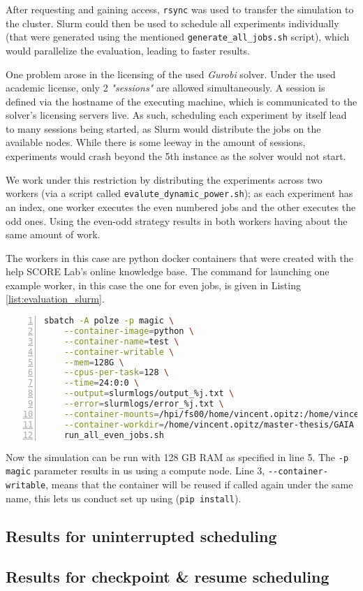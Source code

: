 After requesting and gaining access, \verb|rsync| was used to transfer the simulation to the cluster. 
Slurm could then be used to schedule all experiments individually (that were generated using the mentioned \verb|generate_all_jobs.sh| script), which would parallelize the evaluation, leading to faster results.

One problem arose in the licensing of the used \emph{Gurobi} solver. 
Under the used academic license, only 2 \emph{"sessions"} are allowed simultaneously.
A session is defined via the hostname of the executing machine, which is communicated to the solver's licensing servers live.
As such, scheduling each experiment by itself lead to many sessions being started, as Slurm would distribute the jobs on the available nodes.
While there is some leeway in the amount of sessions, experiments would crash beyond the 5th instance as the solver would not start.

We work under this restriction by distributing the experiments across two workers (via a script called \verb|evalute_dynamic_power.sh|); as each experiment has an index, one worker executes the even numbered jobs and the other executes the odd ones. 
Using the even-odd strategy results in both workers having about the same amount of work.

The workers in this case are python docker containers that were created with the help SCORE Lab's online knowledge base.
The command for launching one example worker, in this case the one for even jobs, is given in Listing \ref{list:evaluation_slurm}.

\begin{lstlisting}[language=bash, frame=single, numbers=left, caption={Executing the Evaluation inside the SCORE Lab's Slurm environment}, label={list:evaluation_slurm}, basicstyle=\ttfamily]
sbatch -A polze -p magic \
    --container-image=python \
    --container-name=test \
    --container-writable \
    --mem=128G \
    --cpus-per-task=128 \
    --time=24:0:0 \
    --output=slurmlogs/output_%j.txt \
    --error=slurmlogs/error_%j.txt \
    --container-mounts=/hpi/fs00/home/vincent.opitz:/home/vincent.opitz \
    --container-workdir=/home/vincent.opitz/master-thesis/GAIA \
    run_all_even_jobs.sh
 \end{lstlisting}

Now the simulation can be run with 128 GB RAM as specified in line 5. 
The \verb|-p magic| parameter results in us using a compute node. 
Line 3, \verb|--container-writable|, means that the container will be reused if called again under the same name, this lets us conduct set up using (\verb|pip install|).

\subsection{Results for uninterrupted scheduling}

\subsection{Results for checkpoint \& resume scheduling}
